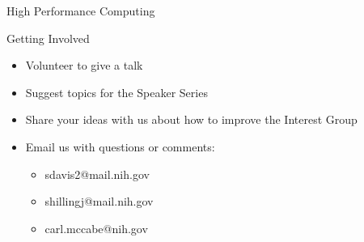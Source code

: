 \documentclass[final]{beamer}
\begin{document}
\begin{frame}[t]
\begin{columns}[t]
\begin{column}{0.3\linewidth}
\begin{block}{High Performance Computing}
      \end{block}
      \begin{block}{Getting Involved}
        \begin{itemize}
          \item{Volunteer to give a talk}
          \item{Suggest topics for the Speaker Series}
          \item{Share your ideas with us about how to improve the Interest Group}
          \item{Email us with questions or comments:}
            \begin{itemize}
              \item{sdavis2@mail.nih.gov}
              \item{shillingj@mail.nih.gov}
              \item{carl.mccabe@nih.gov}
                
            \end{itemize}
          \end{itemize}
        \end{block}
    \end{column}
    \end{columns}
  \end{frame}
\end{document}
